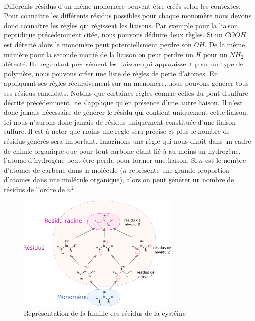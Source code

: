 \documentclass[12pt,french,twoside]{report}
\begin{document}
\paragraph{}Différents résidus d'un même monomère peuvent être créés selon les contextes. Pour connaître les différents résidus
possibles pour chaque monomère nous devons donc connaître les règles qui régissent les liaisons. Par exemple pour la liaison
peptidique précédemment citée, nous pouvons déduire deux règles. Si un $COOH$ est détecté alors le monomère peut potentiellement
perdre son $OH$. De la même manière pour la seconde moitié de la liaison on peut perdre un $H$ pour un $NH_2$ détecté. En
regardant précisément les liaisons qui apparaissent pour un type de polymère, nous pouvons créer une liste de règles de perte
d'atomes. En appliquant ses règles récursivement sur un monomère, nous pouvons générer tous ses résidus candidats. Notons que
certaines règles comme celles du pont disulfure décrite précédemment, ne s'applique qu'en présence d'une autre liaison. Il n'est
donc jamais nécessaire de générer le résidu qui contient uniquement cette liaison. Ici nous n'aurons donc jamais de résidus
uniquement constituée d'une liaison sulfure. Il est
à noter que moins une règle sera précise et plus le nombre de résidus générés sera important. Imaginons une règle qui nous dirait
dans un cadre de chimie organique que pour tout carbone étant lié à au moins un hydrogène, l'atome d'hydrogène peut être perdu
pour former une liaison. Si $n$ est le nombre d'atomes de carbone dans la molécule ($n$ représente une grande proportion d'atomes
dans une molécule organique), alors on peut générer un nombre de résidus de l'ordre de $n^2$.

\begin{figure}
  \includegraphics[width=300px]{Figures/s2m/residues/cystein_family.png}
  \caption{\label{sulfure}Représentation de la famille des résidus de la cystéine}
\end{figure}
\end{document}
